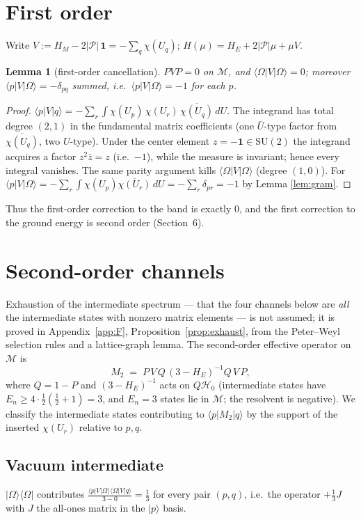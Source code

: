 \documentclass[11pt]{article}
\newtheorem{lemma}[theorem]{Lemma}
\newcommand{\G}{{\mathrm{SU}}(2)}
\begin{document}
\section{First order}\label{sec:first}
Write $V:=H_M-2|\mathcal P|\,\mathbf 1=-\sum_{q}\chi(U_q)$; $H(\mu)=H_E+2|\mathcal P|\mu+\mu V$.
\begin{lemma}[first-order cancellation]\label{lem:first}
$PVP=0$ on $\mathcal M$, and $\langle\Omega|V|\Omega\rangle=0$; moreover
$\langle p|V|\Omega\rangle=-\delta_{pq}$ summed, i.e.\
$\langle p|V|\Omega\rangle=-1$ for each $p$.
\end{lemma}
\begin{proof}
$\langle p|V|q\rangle=-\sum_r\int\chi(U_p)\,\chi(U_r)\,\overline{\chi(U_q)}\,dU$.
The integrand has total degree $(2,1)$ in the fundamental matrix coefficients
(one $\bar U$-type factor from $\overline{\chi(U_q)}$, two $U$-type).
Under the center element $z=-\mathbf 1\in\G$ the integrand acquires a factor
$z^{2}\bar z=z$ (i.e.\ $-1$), while the measure is invariant; hence every
integral vanishes. The same parity argument kills
$\langle\Omega|V|\Omega\rangle$ (degree $(1,0)$). For
$\langle p|V|\Omega\rangle=-\sum_r\int\chi(U_p)\overline{\chi(U_r)}\,dU=-\sum_r\delta_{pr}=-1$
by Lemma \ref{lem:gram}.
\end{proof}
Thus the first-order correction to the band is exactly $0$, and the first
correction to the ground energy is second order (Section~6).

\section{Second-order channels}\label{sec:channels}
Exhaustion of the intermediate spectrum --- that the four channels below are
\emph{all} the intermediate states with nonzero matrix elements --- is not
assumed; it is proved in Appendix~\ref{app:F},
Proposition~\ref{prop:exhaust}, from the Peter--Weyl selection rules and a
lattice-graph lemma.
The second-order effective operator on $\mathcal M$ is
\[
M_2 \;=\; P\,V\,Q\,(3-H_E)^{-1}Q\,V\,P ,
\]
where $Q=1-P$ and $(3-H_E)^{-1}$ acts on $Q\mathcal H_0$ (intermediate
states have $E_n\ge 4\cdot\tfrac12(\tfrac12+1)=3$, and $E_n=3$ states lie in
$\mathcal M$; the resolvent is negative). We classify the intermediate
states contributing to $\langle p|M_2|q\rangle$ by the support of the
inserted $\chi(U_r)$ relative to $p,q$.

\subsection{Vacuum intermediate}
$|\Omega\rangle\langle\Omega|$ contributes
$\frac{\langle p|V|\Omega\rangle\langle\Omega|V|q\rangle}{3-0}
=\frac{1}{3}$ for every pair $(p,q)$, i.e.\ the operator $+\frac13 J$ with
$J$ the all-ones matrix in the $|p\rangle$ basis.
\end{document}
